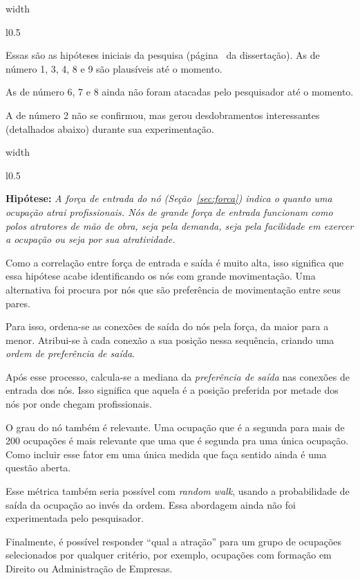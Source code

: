 \documentclass[10pt,a4paper,final]{article}
\newcommand\disappearingrule{%
  \par %
  \vskip10pt %
  \leaders\vrule width \textwidth\vskip0.4pt %
  \nointerlineskip %
  \vskip10pt %
}
\begin{document}
\disappearingrule

\begin{minipage}[t][18\baselineskip]{\linewidth}
  \begin{wrapfigure}{l}{0.5\textwidth}
  \end{wrapfigure}
  
  Essas são as hipóteses iniciais da pesquisa (página~\pageref{sec:resultados-preliminares} da dissertação). As de número 1, 3, 4, 8 e 9 são plausíveis até o momento.
  
  As de número 6, 7 e 8 ainda não foram atacadas pelo pesquisador até o momento.
  
  A de número 2 não se confirmou, mas gerou desdobramentos interessantes (detalhados abaixo) durante sua experimentação.
\end{minipage}

\disappearingrule

\begin{minipage}[t]{\linewidth}
  \begin{wrapfigure}{l}{0.5\textwidth}
  \end{wrapfigure}
  
  \textbf{Hipótese:} \textit{A força de entrada do nó (Seção~\ref{sec:forca}) indica o quanto uma ocupação atrai profissionais. Nós de grande força de entrada funcionam como polos atratores de mão de obra, seja pela demanda, seja pela facilidade em exercer a ocupação ou seja por sua atratividade.}
  
  Como a correlação entre força de entrada e saída é muito alta, isso significa que essa hipótese acabe identificando os nós com grande movimentação. Uma alternativa foi procura por nós que são preferência de movimentação entre seus pares.

  Para isso, ordena-se as conexões de saída do nós pela força, da maior para a menor. Atribui-se à cada conexão a sua posição nessa sequência, criando uma \textit{ordem de preferência de saída}.
  
  Após esse processo, calcula-se a mediana da \textit{preferência de saída} nas conexões de entrada dos nós. Isso significa que aquela é a posição preferida por metade dos nós por onde chegam profissionais.
  
  O grau do nó também é relevante. Uma ocupação que é a segunda para mais de 200 ocupações é mais relevante que uma que é segunda pra uma única ocupação. Como incluir esse fator em uma única medida que faça sentido ainda é uma questão aberta.
  
  Esse métrica também seria possível com \textit{random walk}, usando a probabilidade de saída da ocupação ao invés da ordem. Essa abordagem ainda não foi experimentada pelo pesquisador.
  
  Finalmente, é possível responder \enquote{qual a atração} para um grupo de ocupações selecionados por qualquer critério, por exemplo, ocupações com formação em Direito ou Administração de Empresas.
\end{minipage}
\end{document}
